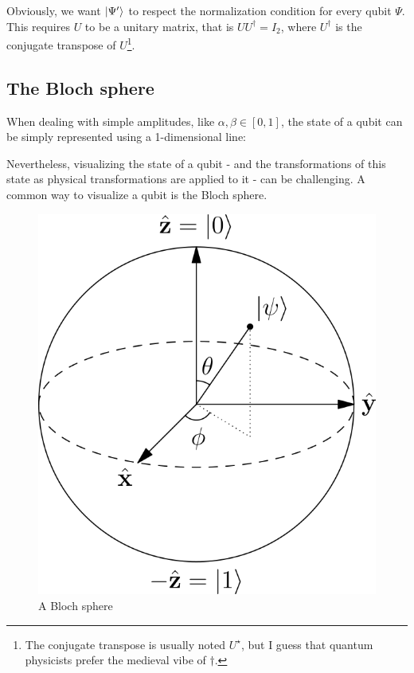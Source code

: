 \documentclass[12pt,a4paper]{article}
\theoremstyle{plain}
\theoremstyle{definition}
\DeclarePairedDelimiter\ket{\lvert}{\rangle}
\begin{document}
Obviously, we want $\ket{\Psi'}$ to respect the normalization condition for every qubit $\Psi$. This requires $U$ to be a unitary matrix, that is $UU^\dagger = I_2$, where $U^\dagger$ is the conjugate transpose of $U$\footnote{The conjugate transpose is usually noted $U^\star$, but I guess that quantum physicists prefer the medieval vibe of $\dagger$.}.

\subsection{The Bloch sphere}
When dealing with simple amplitudes, like $\alpha, \beta\in [0, 1]$, the state of a qubit can be simply represented using a 1-dimensional line:

Nevertheless, visualizing the state of a qubit - and the transformations of this state as physical transformations are applied to it - can be challenging. A common way to visualize a qubit is the Bloch sphere.

\begin{figure}
    \centering
    \includegraphics*{bloch-sphere}
    \caption{A Bloch sphere}
\end{figure}
\end{document}
